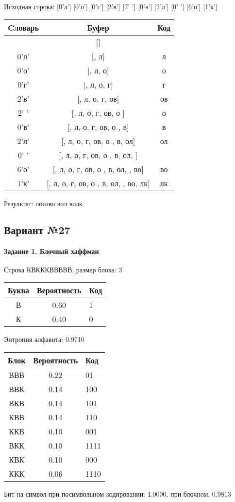 \documentclass[a4paper, 12pt]{article}
\begin{document}
Исходная строка: [0'л'] [0'о'] [0'г'] [2'в'] [2' '] [0'в'] [2'л'] [0' '] [6'о'] [1'к']\\
\begin{table}[h!]
\centering
\begin{tabular}{|c|c|c|}
\hline
 Cловарь & Буфер & Код  \\ \hline
 & [] & 
\\ \hline
0'л' & [, л] & л
\\ \hline
0'о' & [, л, о] & о
\\ \hline
0'г' & [, л, о, г] & г
\\ \hline
2'в' & [, л, о, г, ов] & ов
\\ \hline
2' ' & [, л, о, г, ов, о ] & о 
\\ \hline
0'в' & [, л, о, г, ов, о , в] & в
\\ \hline
2'л' & [, л, о, г, ов, о , в, ол] & ол
\\ \hline
0' ' & [, л, о, г, ов, о , в, ол,  ] &  
\\ \hline
6'о' & [, л, о, г, ов, о , в, ол,  , во] & во
\\ \hline
1'к' & [, л, о, г, ов, о , в, ол,  , во, лк] & лк
\\ \hline
\end{tabular}
\end{table}

Результат: логово вол волк
\pagebreak
\subsection{Вариант №27}
\paragraph{Задание 1. Блочный хаффман \\}

Строка КВКККВВВВВ, размер блока: 3
\begin{center}
 \begin{tabular}{ |c|c|l| } 
  \hline
     Буква & Вероятность & Код\\ \hline
В & 0.60 & 1\\\hline
К & 0.40 & 0
\\ \hline \end{tabular}
\end{center}
Энтропия алфавита: 0.9710
\begin{center}
 \begin{tabular}{ |c|c|l| } 
  \hline
     Блок & Вероятность & Код\\ \hline
ВВВ & 0.22 & 01\\\hline
ВВК & 0.14 & 100\\\hline
ВКВ & 0.14 & 101\\\hline
КВВ & 0.14 & 110\\\hline
ККВ & 0.10 & 001\\\hline
ВКК & 0.10 & 1111\\\hline
КВК & 0.10 & 000\\\hline
ККК & 0.06 & 1110
\\ \hline \end{tabular}
\end{center}
Бит на символ при посимвольном кодировании: 1.0000, при блочном: 0.9813
\end{document}
